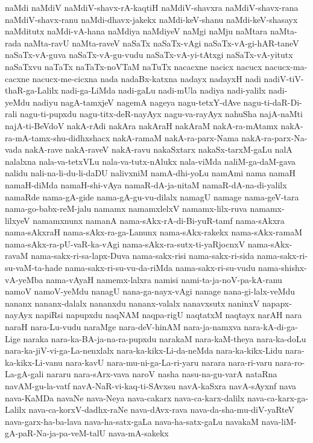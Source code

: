 {naMdi
naMdiV
naMdiV-shavx-rA-kaqtiH
naMdiV-shavxra
naMdiV-shavx-rana
naMdiV-shavx-ranu
naMdi-dhavx-jakekx
naMdi-keV-shanu
naMdi-keV-shasayx
naMditutx
naMdi-vA-hana
naMdiya
naMdiyeV
naMgi
naMju
naMtara
naMta-rada
naMta-ravU
naMta-raveV
naSaTx
naSaTx-vAgi
naSaTx-vA-gi-hAR-taneV
naSaTx-vA-guva
naSaTx-vA-gu-vudu
naSaTx-vA-yi-tAtxgi
naSaTx-vA-yitutx
naSaTxvu
naTaTx
naTaTx-noVTaM
naTuTx
nacacxne
nacicx
nacucx
nacucx-ma-cacxne
nacucx-me-cicxna
nada
nadaBx-katxna
nadayx
nadayxH
nadi
nadiV-tiV-thaR-ga-Lalilx
nadi-ga-LiMda
nadi-gaLu
nadi-mUla
nadiya
nadi-yalilx
nadi-yeMdu
nadiyu
nagA-tamxjeV
nagemA
nageya
nagu-tetxY-dAve
nagu-ti-daR-Di-rali
nagu-ti-pupxdu
nagu-titx-deR-nayAyx
nagu-va-rayAyx
nahuSha
najA-naMti
najA-ti-BeVdoV
nakA-rAdi
nakAra
nakAraH
nakAraM
nakA-ra-mAtamx
nakA-ra-mA-tamx-shu-didhxshacx
nakA-ramaM
nakA-ra-parx-Nama
nakA-ra-parx-Na-vada
nakA-rave
nakA-raveV
nakA-ravu
nakaSxtarx
nakaSx-tarxM-gaLu
nalA
nalalxna
nala-va-tetxVLu
nala-va-tutx-nAlukx
nala-viMda
naliM-ga-daM-gava
nalidu
nali-na-li-du-li-daDU
nalivxniM
namA-dhi-yoLu
namAmi
nama
namaH
namaH-diMda
namaH-shi-vAya
namaR-dA-ja-nitaM
namaR-dA-na-di-yalilx
namaRde
nama-gA-gide
nama-gA-gu-vu-dilalx
namagU
namage
nama-geV-tara
nama-go-babx-reM-jalu
namamx
namamxlelxV
namamx-lilx-ruva
namamx-lilxyeV
namamxnunx
namanA
nama-sAkx-rA-di-Bi-yuR-tamf
nama-sAkxra
nama-sAkxraH
nama-sAkx-ra-ga-Lanunx
nama-sAkx-rakekx
nama-sAkx-ramaM
nama-sAkx-ra-pU-vaR-ka-vAgi
nama-sAkx-ra-sutx-ti-yaRjocnxV
nama-sAkx-ravaM
nama-sakx-ri-sa-lapx-Duva
nama-sakx-risi
nama-sakx-ri-sida
nama-sakx-ri-su-vaM-ta-hade
nama-sakx-ri-su-vu-da-riMda
nama-sakx-ri-su-vudu
nama-shishx-vA-yeMba
nama-vAyaH
namemx-lalxra
namisi
nami-ta-ja-noV-pa-kA-ranu
namoV
namoV-yeMdu
nanagU
nana-ga-nayx-vAgi
nanage
nana-gi-lalx-veMdu
nananx
nananx-dalalx
nananxdu
nananx-valalx
nanavxsutx
naninxV
napapx-nayAyx
napiRsi
napupxdu
naqNAM
naqpa-rigU
naqtatxM
naqtayx
narAH
nara
naraH
nara-Lu-vudu
naraMge
nara-deV-hinAM
nara-ja-namxva
nara-kA-di-ga-Lige
naraka
nara-ka-BA-ja-na-ra-pupxdu
narakaM
nara-kaM-theya
nara-ka-doLu
nara-ka-jiV-vi-ga-La-nenxlalx
nara-ka-kikx-Li-da-neMda
nara-ka-kikx-Lidu
nara-ka-kikx-Li-vanu
nara-kavU
nara-mu-ni-ga-La-ri-yaru
narara
nara-ri-varu
nara-ro-La-gA-gali
nararu
nara-sArx-vava
naroV
nasha
nasu-na-gu-varA
nataRna
navAM-gu-la-vatf
navA-NaR-vi-kaq-ti-SAvxsu
navA-kaSxra
navA-sAyxnf
nava
nava-KaMDa
navaNe
nava-Neya
nava-cakarx
nava-ca-karx-dalilx
nava-ca-karx-ga-Lalilx
nava-ca-korxV-dadhx-raNe
nava-dAvx-rava
nava-da-sha-mu-diV-yaRteV
nava-garx-ha-ba-lava
nava-ha-satx-gaLa
nava-ha-satx-gaLu
navakaM
nava-liM-gA-paR-Na-ja-pa-veM-talU
nava-mA-sakekx
}
